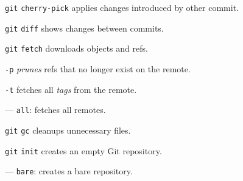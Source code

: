 \documentclass{reference_card}
\begin{document}
\begin{multicols*}{3}
\begin{compactenum}
\item [\texttt{git}] \texttt{cherry-pick} applies changes introduced by other commit.
\end{compactenum}

\begin{compactenum}
\item [\texttt{git}] \texttt{diff} shows changes between commits.
\end{compactenum}

\begin{compactenum}
\item [\texttt{git}] \texttt{fetch} downloads objects and refs.
\item [\texttt{-p}] \emph{prunes} refs that no longer exist on the remote.
\item [\texttt{-t}] fetches all \emph{tags} from the remote.
\item [---] \texttt{all}: fetches all remotes.
\end{compactenum}

\begin{compactenum}
\item [\texttt{git}] \texttt{gc} cleanups unnecessary files.
\end{compactenum}

\begin{compactenum}
\item [\texttt{git}] \texttt{init} creates an empty Git repository.
\item [---] \texttt{bare}: creates a bare repository.
\end{compactenum}


\end{multicols*}
\end{document}
